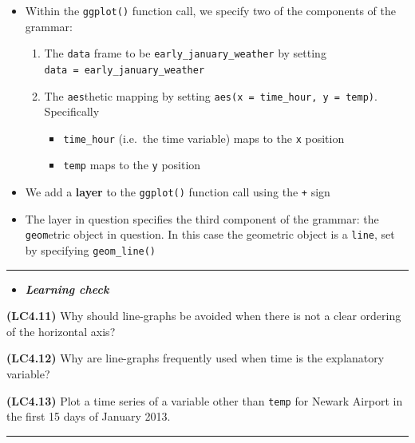\documentclass[]{tufte-book}
\let\oldrule=\rule
\renewcommand{\rule}[1]{\oldrule{\linewidth}}
\providecommand{\tightlist}{%
  \setlength{\itemsep}{0pt}\setlength{\parskip}{0pt}}
\newenvironment{rmdblock}[1]
  {\begin{shaded*}
  \begin{itemize}
  \renewcommand{\labelitemi}{
    \raisebox{-.7\height}[0pt][0pt]{
    }
  }
  \item
  }
  {
  \end{itemize}
  \end{shaded*}
  }
\newenvironment{learncheck}
  {\begin{rmdblock}{warning}}
  {\end{rmdblock}}
\begin{document}
\begin{itemize}
\tightlist
\item
  Within the \texttt{ggplot()} function call, we specify two of the
  components of the grammar:

  \begin{enumerate}
  \def\labelenumi{\arabic{enumi}.}
  \tightlist
  \item
    The \texttt{data} frame to be \texttt{early\_january\_weather} by
    setting \texttt{data\ =\ early\_january\_weather}
  \item
    The \texttt{aes}thetic mapping by setting
    \texttt{aes(x\ =\ time\_hour,\ y\ =\ temp)}. Specifically

    \begin{itemize}
    \tightlist
    \item
      \texttt{time\_hour} (i.e.~the time variable) maps to the
      \texttt{x} position
    \item
      \texttt{temp} maps to the \texttt{y} position
    \end{itemize}
  \end{enumerate}
\item
  We add a \textbf{layer} to the \texttt{ggplot()} function call using
  the \texttt{+} sign
\item
  The layer in question specifies the third component of the grammar:
  the \texttt{geom}etric object in question. In this case the geometric
  object is a \texttt{line}, set by specifying \texttt{geom\_line()}
\end{itemize}

\begin{center}\rule{0.5\linewidth}{\linethickness}\end{center}

\begin{learncheck}
\textbf{\emph{Learning check}}
\end{learncheck}

\textbf{(LC4.11)} Why should line-graphs be avoided when there is not a
clear ordering of the horizontal axis?

\textbf{(LC4.12)} Why are line-graphs frequently used when time is the
explanatory variable?

\textbf{(LC4.13)} Plot a time series of a variable other than
\texttt{temp} for Newark Airport in the first 15 days of January 2013.

\begin{center}\rule{0.5\linewidth}{\linethickness}\end{center}
\end{document}
